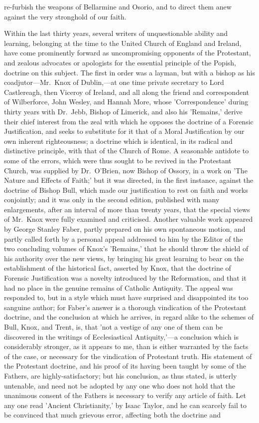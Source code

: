 \documentclass[
]{book}
\begin{document}
re-furbish the weapons of Bellarmine and Osorio, and to direct them anew against the very stronghold of our faith.

Within the last thirty years, several writers of unquestionable ability and learning, belonging at the time to the United Church of England and Ireland, have come prominently forward as uncompromising opponents of the Protestant, and zealous advocates or apologists for the essential principle of the Popish, doctrine on this subject. The first in order was a layman, but with a bishop as his coadjutor---Mr.~Knox of Dublin,---at one time private secretary to Lord Castlereagh, then Viceroy of Ireland, and all along the friend and correspondent of Wilberforce, John Wesley, and Hannah More, whose 'Correspondence' during thirty years with Dr.~Jebb, Bishop of Limerick, and also his 'Remains,' derive their chief interest from the zeal with which he opposes the doctrine of a Forensic Justification, and seeks to substitute for it that of a Moral Justification by our own inherent righteousness; a doctrine which is identical, in its radical and distinctive principle, with that of the Church of Rome. A seasonable antidote to some of the errors, which were thus sought to be revived in the Protestant Church, was supplied by Dr.~O'Brien, now Bishop of Ossory, in a work on 'The Nature and Effects of Faith;' but it was directed, in the first instance, against the doctrine of Bishop Bull, which made our justification to rest on faith and works conjointly; and it was only in the second edition, published with many enlargements, after an interval of more than twenty years, that the special views of Mr.~Knox were fully examined and criticised. Another valuable work appeared by George Stanley Faber, partly prepared on his own spontaneous motion, and partly called forth by a personal appeal addressed to him by the Editor of the two concluding volumes of Knox's 'Remains,' that he should throw the shield of his authority over the new views, by bringing his great learning to bear on the establishment of the historical fact, asserted by Knox, that the doctrine of Forensic Justification was a novelty introduced by the Reformation, and that it had no place in the genuine remains of Catholic Antiquity. The appeal was responded to, but in a style which must have surprised and disappointed its too sanguine author; for Faber's answer is a thorough vindication of the Protestant doctrine, and the conclusion at which he arrives, in regard alike to the schemes of Bull, Knox, and Trent, is, that 'not a vestige of any one of them can be discovered in the writings of Ecclesiastical Antiquity,'---a conclusion which is considerably stronger, as it appears to me, than is either warranted by the facts of the case, or necessary for the vindication of Protestant truth. His statement of the Protestant doctrine, and his proof of its having been taught by some of the Fathers, are highly-satisfactory; but his conclusion, as thus stated, is utterly untenable, and need not be adopted by any one who does not hold that the unanimous consent of the Fathers is necessary to verify any article of faith. Let any one read 'Ancient Christianity,' by Isaac Taylor, and he can scarcely fail to be convinced that much grievous error, affecting both the doctrine and 
\end{document}
